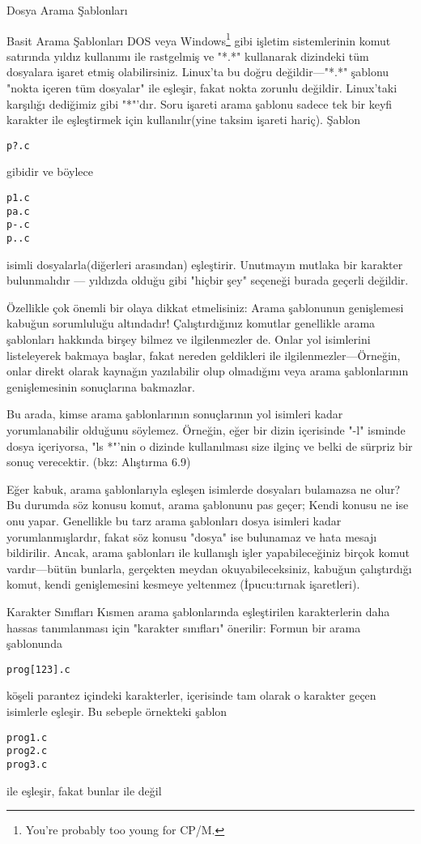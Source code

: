 \begin{section}{Dosya Arama Şablonları}
\begin{subsection}{Basit Arama Şablonları}
DOS veya Windows\footnote{You’re probably too young for CP/M.} gibi işletim sistemlerinin komut satırında yıldız kullanımı ile rastgelmiş ve "*.*" kullanarak dizindeki tüm dosyalara işaret etmiş olabilirsiniz. Linux'ta bu doğru değildir—"*.*" şablonu "nokta içeren tüm dosyalar" ile eşleşir, fakat nokta zorunlu değildir. Linux'taki karşılığı dediğimiz gibi "*"'dır. Soru işareti arama şablonu sadece tek bir keyfi karakter ile eşleştirmek için kullanılır(yine taksim işareti hariç). Şablon
\begin{verbatim}
p?.c
\end{verbatim}
gibidir ve böylece
\begin{verbatim}
p1.c
pa.c
p-.c
p..c
\end{verbatim}
isimli dosyalarla(diğerleri arasından) eşleştirir. Unutmayın mutlaka bir karakter bulunmalıdır — yıldızda olduğu gibi "hiçbir şey" seçeneği burada geçerli değildir.

Özellikle çok önemli bir olaya dikkat etmelisiniz: Arama şablonunun genişlemesi kabuğun sorumluluğu altındadır! Çalıştırdığınız komutlar genellikle arama şablonları hakkında birşey bilmez ve ilgilenmezler de. Onlar yol isimlerini listeleyerek bakmaya başlar, fakat nereden geldikleri ile ilgilenmezler—Örneğin, onlar direkt olarak kaynağın yazılabilir olup olmadığını veya arama şablonlarının genişlemesinin sonuçlarına bakmazlar.

Bu arada, kimse arama şablonlarının sonuçlarının yol isimleri kadar yorumlanabilir olduğunu söylemez. Örneğin, eğer bir dizin içerisinde "-l" isminde dosya içeriyorsa,  "ls *"'nin o dizinde kullanılması size ilginç ve belki de sürpriz bir sonuç verecektir. (bkz: Alıştırma 6.9)

Eğer kabuk, arama şablonlarıyla eşleşen isimlerde dosyaları bulamazsa ne olur? Bu durumda söz konusu komut, arama şablonunu pas geçer; Kendi konusu ne ise onu yapar. Genellikle bu tarz arama şablonları dosya isimleri kadar yorumlanmışlardır, fakat söz konusu "dosya" ise bulunamaz ve hata mesajı bildirilir. Ancak, arama şablonları ile kullanışlı işler yapabileceğiniz birçok komut vardır—bütün bunlarla, gerçekten meydan okuyabileceksiniz, kabuğun çalıştırdığı komut, kendi genişlemesini kesmeye yeltenmez (İpucu:tırnak işaretleri).
\end{subsection}
\begin{subsection}{Karakter Sınıfları}
Kısmen arama şablonlarında eşleştirilen karakterlerin daha hassas tanımlanması için "karakter sınıfları" önerilir: Formun bir arama şablonunda
\begin{verbatim}
prog[123].c
\end{verbatim}
köşeli parantez içindeki karakterler, içerisinde tam olarak o karakter geçen isimlerle eşleşir. Bu sebeple örnekteki şablon
\begin{verbatim}
prog1.c
prog2.c
prog3.c
\end{verbatim}
ile eşleşir, fakat bunlar ile değil


\end{subsection}
\end{section}
